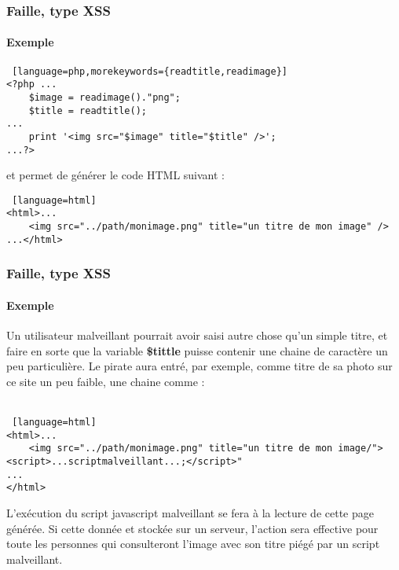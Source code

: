 \begin{frame}[containsverbatim]
\frametitle<presentation>{Faille, type XSS}
\framesubtitle<presentation>{Exemple}
\begin{lstlisting} [language=php,morekeywords={readtitle,readimage}]
<?php ...
	$image = readimage()."png";
	$title = readtitle();
...
	print '<img src="$image" title="$title" />';
...?>
\end{lstlisting}

et permet de générer le code HTML suivant : \\

\begin{lstlisting} [language=html]
<html>...
	<img src="../path/monimage.png" title="un titre de mon image" />
...</html>
\end{lstlisting}
\end{frame}




\begin{frame}[containsverbatim]
\frametitle<presentation>{Faille, type XSS}
\framesubtitle<presentation>{Exemple}
Un utilisateur malveillant pourrait avoir saisi autre chose qu'un simple titre, et faire en sorte que la variable \textbf{\$tittle} puisse contenir une chaine de caractère un peu particulière. Le pirate aura entré, par exemple, comme titre de sa photo sur ce site un peu faible, une chaine comme  : \\
\\
\begin{lstlisting} [language=html]
<html>...
	<img src="../path/monimage.png" title="un titre de mon image/"><script>...scriptmalveillant...;</script>" 
...
</html>
\end{lstlisting}

\end{frame}



L'exécution du script javascript malveillant se fera à la lecture de cette page générée. Si cette donnée et stockée sur un serveur, l'action sera effective pour toute les personnes qui consulteront l'image avec son titre piégé par un script malveillant.

